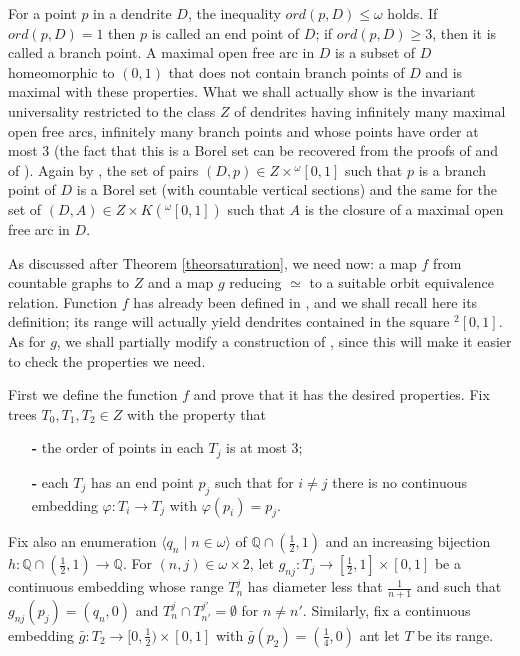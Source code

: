 \documentclass{amsart}
\theoremstyle{definition}
\theoremstyle{remark}
\begin{document}
For a point $p$ in a dendrite $D$, the inequality $ord(p,D)\leq\omega $ holds.
If $ord(p,D)=1$ then $p$ is called an end point of $D$; if
$ord(p,D)\geq 3$, then it is called a branch point.
A maximal open free arc in $D$ is a subset of $D$ homeomorphic to
$(0,1)$ that does not contain branch points of $D$ and is maximal with
these properties.
What we shall actually show is the invariant universality restricted
to the class $Z$ of dendrites having infinitely many maximal open free
arcs, infinitely many branch points and whose points have order at
most $3$ (the fact that this is a Borel set can be recovered from the
proofs of \cite[Lemma 6.5]{CDM2005} and of \cite[Lemma 1.4]{MarRos}).
Again by \cite{CDM2005}, the set of pairs $(D,p)\in Z\times {}^{\omega
}[0,1]$ such that $p$ is a branch point of $D$ is a Borel set (with
countable vertical sections) and the same for the set of $(D,A)\in Z\times
K({}^{\omega }[0,1])$ such that $A$ is the closure of a maximal open
free arc in $D$.

As discussed after Theorem \ref{theorsaturation}, we need now: a map
$f$ from countable graphs to $Z$ and a map $g$ reducing $\simeq $ to a
suitable orbit equivalence relation.
Function $f$ has already been defined in \cite{Camerlo}, and we shall
recall here its definition; its range will actually
yield dendrites contained in the square ${}^2[0,1]$.
As for $g$, we shall
partially modify a construction of \cite{CDM2005}, since this will
make it easier to check the properties we need.

First we define the function $f$ and prove that it has the desired
properties. Fix trees $T_0,T_1,T_2\in Z$ with the property that
\begin{itemize}
\item[{\bf -}] the order of points in each $T_j$ is at most $3$;
\item[{\bf -}] each
$T_j$ has an end point $p_j$ such that for $i\neq j$ there is
no continuous embedding $ {\varphi} \colon T_i\to T_j$ with $ {\varphi} (p_i)=p_j$.
\end{itemize}
Fix also an enumeration $\langle  q_n \mid n\in\omega \rangle$ of $
{\mathbb{Q}} \cap ( \frac 12 ,1)$ and an increasing bijection $h\colon  {\mathbb{Q}} \cap (
\frac 12 ,1)\to {\mathbb{Q}}
$.
For $(n,j)\in\omega\times 2$, let $g_{nj}\colon T_j\to [ \frac 12 ,1]\times
[0,1]$ be a continuous embedding whose range $T_n^j$ has diameter less
that $ \frac 1{n+1} $ and such that $g_{nj}(p_j)=(q_n,0)$ and
$T_n^j\cap T_{n'}^{j'}=\emptyset $ for $n\neq n'$.
Similarly, fix a continuous embedding $ \bar g \colon T_2\to [0, \frac 12
)\times [0,1]$ with $ \bar g (p_2)=( \frac 14 ,0)$ ant let $T$ be
its range.
\end{document}
